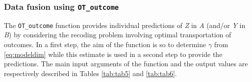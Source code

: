 \hypertarget{data-fusion-using-ot_outcome}{%
\subsubsection{\texorpdfstring{Data fusion using \texttt{OT\_outcome}}{Data fusion using OT\_outcome}}\label{data-fusion-using-ot_outcome}}

The \texttt{OT\_outcome} function provides individual predictions of \emph{Z} in \emph{A} (and/or \emph{Y} in \emph{B}) by considering the recoding problem involving optimal transportation of outcomes. In a first step, the aim of the function is so to determine \(\gamma\) from \eqref{eq:modeldim} while this estimate is used in a second step to provide the predictions. The main input arguments of the function and the output values are respectively described in Tables \ref{tab:tab5} and \ref{tab:tab6}.

